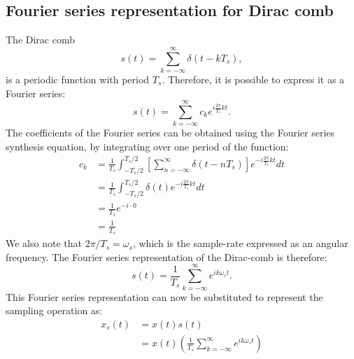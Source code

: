 \subsection{Fourier series representation for Dirac comb}
The Dirac comb
\begin{equation}
s(t) = \sum_{k=-\infty}^{\infty} \delta(t-kT_s),
\end{equation}
is a periodic function with period $T_s$. Therefore, it is possible to express it as a Fourier series:
\begin{equation}
s(t) = \sum_{k=-\infty}^{\infty} c_k e^{i\frac{2\pi}{T_s}kt}.
\end{equation}
The coefficients of the Fourier series can be obtained using the Fourier series synthesis equation, by integrating over one period of the function:
\begin{align}
c_k &= \frac{1}{T_s}\int_{-T_s/2}^{T_s/2} \left[\sum_{n=-\infty}^{\infty} \delta(t-nT_s) \right] e^{-i\frac{2\pi}{T_s}kt}dt \\
&=\frac{1}{T_s}\int_{-T_s/2}^{T_s/2} \delta(t)  e^{-i\frac{2\pi}{T_s}kt}dt \\
    &=\frac{1}{T_s}e^{-i\cdot 0}\\
    &=\frac{1}{T_s}
\end{align}
We also note that $2\pi/T_s = \omega_s$, which is the sample-rate expressed as an angular frequency. The Fourier series representation of the Dirac-comb is therefore:
\begin{equation}
s(t) = \frac{1}{T_s}\sum_{k=-\infty}^{\infty} e^{i k \omega_s t}.
\end{equation}
This Fourier series representation can now be substituted to represent the sampling operation as:
\begin{align}
x_s(t) & = x(t)s(t) \\
 &= x(t)  \left(\frac{1}{T_s}\sum_{k=-\infty}^{\infty} e^{i k \omega_s t}\right)
\end{align}

